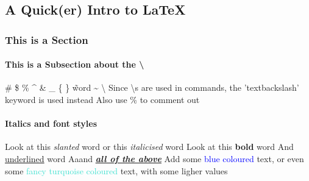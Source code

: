 \documentclass[12pt,twoside,a4paper]{article}
\begin{document}
\begin{center}
  \part*{A Quick(er) Intro to \LaTeX} %
\end{center}

\section*{This is a Section}

\subsection*{This is a Subsection about the \textbackslash}

\# \$ \% \^{} \& \_ \{ \} \~word \~{} \textbackslash
\newline \newline Since \textbackslash s are used in commands, the 'textbackslash' keyword is used instead
\newline Also use \% to comment out %

\subsection*{Italics and font styles}
Look at this \textsl{slanted} word
\newline or this \textit{italicised} word %
\newline Look at this \textbf{bold} word \newline And \underline{underlined} word
\newline Aaand \textbf{\textit{\underline{all of the above}}}
\newline \newline Add some \textcolor{blue}{blue coloured} text, or even some
\textcolor{Turquoise}{fancy turquoise coloured} text, with some
\textcolor{TurquoiseLighter2}{ligher values}
\newpage
\end{document}
